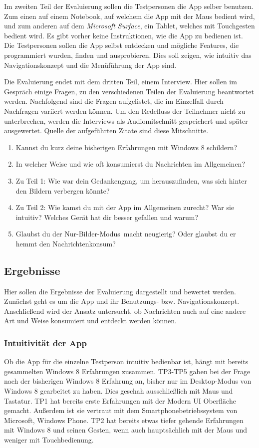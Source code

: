 \documentclass[12pt,a4paper,bibtotoc,abstracton]{scrartcl}
\begin{document}
Im zweiten Teil der Evaluierung sollen die Testpersonen die App selber benutzen. Zum einen auf einem Notebook, auf welchem die App mit der Maus bedient wird, und zum anderen auf dem \textit{Microsoft Surface}, ein Tablet, welches mit Touchgesten bedient wird. Es gibt vorher keine Instruktionen, wie die App zu bedienen ist. Die Testpersonen sollen die App selbst entdecken und mögliche Features, die programmiert wurden, finden und ausprobieren. Dies soll zeigen, wie intuitiv das Navigationskonzept und die Menüführung der App sind.

Die Evaluierung endet mit dem dritten Teil, einem Interview. Hier sollen im Gespräch einige Fragen, zu den verschiedenen Teilen der Evaluierung beantwortet werden. Nachfolgend sind die Fragen aufgelistet, die im Einzelfall durch Nachfragen variiert werden können. Um den Redefluss der Teilnehmer nicht zu unterbrechen, werden die Interviews als Audiomitschnitt gespeichert und später ausgewertet. Quelle der aufgeführten Zitate sind diese Mitschnitte.

\begin{enumerate}
	\item Kannst du kurz deine bisherigen Erfahrungen mit Windows 8 schildern?
	\item In welcher Weise und wie oft konsumierst du Nachrichten im Allgemeinen? 
	\item Zu Teil 1: Wie war dein Gedankengang, um herauszufinden, was sich hinter den Bildern verbergen könnte?
	\item Zu Teil 2: Wie kamst du mit der App im Allgemeinen zurecht? War sie intuitiv? Welches Gerät hat dir besser gefallen und warum?
	\item Glaubst du der \glqq Nur-Bilder-Modus\grqq\ macht neugierig? Oder glaubst du er hemmt den Nachrichtenkonsum? 
\end{enumerate}


\subsection{Ergebnisse}
\label{subsec:ergebnisse}
Hier sollen die Ergebnisse der Evaluierung dargestellt und bewertet werden. Zunächst geht es um die App und ihr Benutzungs- bzw. Navigationskonzept. Anschließend wird der Ansatz untersucht, ob Nachrichten auch auf eine andere Art und Weise konsumiert und entdeckt werden können.

\subsubsection{Intuitivität der App} 
\label{subsubsec:intuitivitätderapp}
Ob die App für die einzelne Testperson intuitiv bedienbar ist, hängt mit bereits gesammelten Windows 8 Erfahrungen zusammen. TP3-TP5 gaben bei der Frage nach der bisherigen Windows 8 Erfahrung an, bisher nur im Desktop-Modus von Windows 8 gearbeitet zu haben. Dies geschah ausschließlich mit Maus und Tastatur. TP1 hat bereits erste Erfahrungen mit der Modern UI Oberfläche gemacht. Außerdem ist sie vertraut mit dem Smartphonebetriebssystem von Microsoft, Windows Phone. TP2 hat bereits etwas tiefer gehende Erfahrungen mit Windows 8 und seinen Gesten, wenn auch hauptsächlich mit der Maus und weniger mit Touchbedienung.
\end{document}
